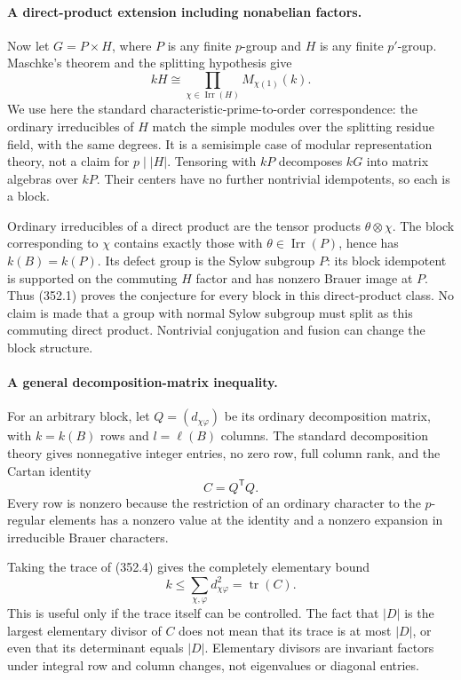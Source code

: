 \documentclass[11pt]{article}
\begin{document}
\paragraph{A direct-product extension including nonabelian factors.}
Now let $G=P\times H$, where $P$ is any finite $p$-group and $H$
is any finite $p'$-group. Maschke's theorem and the splitting hypothesis
give
\[
 kH\cong\prod_{\chi\in\operatorname{Irr}(H)}M_{\chi(1)}(k).
\]
We use here the standard characteristic-prime-to-order correspondence:
the ordinary irreducibles of $H$ match the simple modules over the
splitting residue field, with the same degrees. It is a semisimple
case of modular representation theory, not a claim for $p\mid|H|$.
Tensoring with $kP$ decomposes $kG$ into matrix algebras over $kP$.
Their centers have no further nontrivial idempotents, so each is a block.

Ordinary irreducibles of a direct product are the tensor products
$\theta\otimes\chi$. The block corresponding to $\chi$ contains
exactly those with $\theta\in\operatorname{Irr}(P)$, hence has
$k(B)=k(P)$. Its defect group is the Sylow subgroup $P$: its block
idempotent is supported on the commuting $H$ factor and has nonzero
Brauer image at $P$. Thus (352.1) proves the conjecture for every
block in this direct-product class. No claim is made that a group with
normal Sylow subgroup must split as this commuting direct product.
Nontrivial conjugation and fusion can change the block structure.

\paragraph{A general decomposition-matrix inequality.}
For an arbitrary block, let $Q=(d_{\chi\varphi})$ be its ordinary
decomposition matrix, with $k=k(B)$ rows and $l=\ell(B)$ columns.
The standard decomposition theory gives nonnegative integer entries,
no zero row, full column rank, and the Cartan identity
\[
 C=Q^{\mathsf T}Q.
 \tag{352.4}
\]
Every row is nonzero because the restriction of an ordinary character
to the $p$-regular elements has a nonzero value at the identity and
a nonzero expansion in irreducible Brauer characters.

Taking the trace of (352.4) gives the completely elementary bound
\[
 k\le\sum_{\chi,\varphi}d_{\chi\varphi}^2
       =\operatorname{tr}(C).
 \tag{352.5}
\]
This is useful only if the trace itself can be controlled. The fact
that $|D|$ is the largest elementary divisor of $C$ does not mean
that its trace is at most $|D|$, or even that its determinant equals
$|D|$. Elementary divisors are invariant factors under integral row
and column changes, not eigenvalues or diagonal entries.
\end{document}
